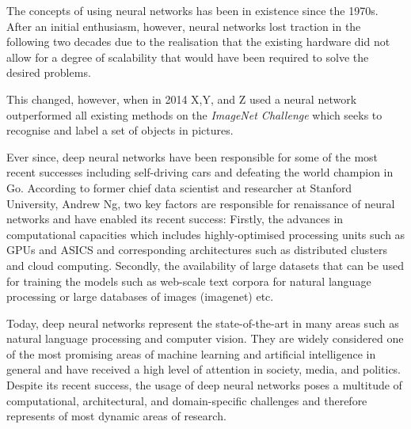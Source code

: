 The concepts of using neural networks has been in existence since the 1970s. %
After an initial enthusiasm, however, neural networks lost traction in the following two decades due to the realisation that the existing hardware did not allow for a degree of scalability that would have been required to solve the desired problems. %

This changed, however, when in 2014 X,Y, and Z used a neural network outperformed all existing methods on the \emph{ImageNet Challenge} which seeks to recognise and label a set of objects in pictures. %

Ever since, deep neural networks have been responsible for some of the most recent successes including self-driving cars and defeating the world champion in Go. %
According to former chief data scientist and researcher at Stanford University, Andrew Ng, %
two key factors are responsible for renaissance of neural networks and have enabled its recent success: Firstly, the advances in computational capacities which includes highly-optimised processing units such as GPUs and ASICS %
and corresponding architectures such as distributed clusters and cloud computing. Secondly, the availability of large datasets that can be used for training the models such as web-scale text corpora for natural language processing or large databases of images (imagenet) etc. 

Today, deep neural networks represent the state-of-the-art in many areas such as natural language processing %
and computer vision. They are widely considered one of the most promising areas of machine learning and artificial intelligence in general %
and have received a high level of attention in society, media, and politics. Despite its recent success, the usage of deep neural networks poses a multitude of computational, architectural, and domain-specific challenges %
and therefore represents of most dynamic areas of research. 

